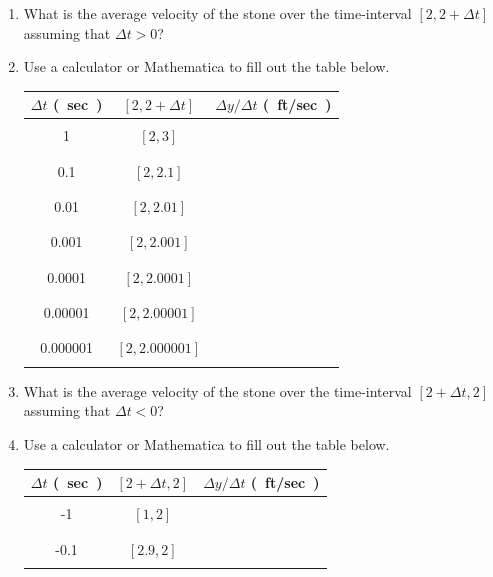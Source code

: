 \begin{enumerate}
\item What is the average velocity of the stone over the time-interval $[2,2+\Delta t]$ assuming that $\Delta t>0$?
\vfill
\item Use a calculator or Mathematica to fill out the table below.
\begin{table}[H]
\begin{tabular}{|c|c|c|}
\hline
$\Delta t$ \si{(sec)} & $[2,2+\Delta t]$ & $\Delta y/\Delta t$ \si{(ft/sec)}\\
\hline\hline
&&\\
1  & $[2,3]$ &\\
&&\\
\hline
&&\\
0.1 & $[2,2.1]$ & \\
&&\\
\hline
&&\\
0.01 & $[2,2.01]$ & \\
&&\\
\hline
&&\\
0.001 & $[2,2.001]$ & \\
&&\\
\hline
&&\\
0.0001 &$[2,2.0001]$& \\
&&\\
\hline
&&\\
0.00001 &$[2,2.00001]$& \\
&&\\
\hline
&&\\
0.000001 &$[2,2.000001]$& \\
&&\\
\hline
\end{tabular}
\end{table}
\vfill
\newpage
\item What is the average velocity of the stone over the time-interval $[2+\Delta t,2]$ assuming that $\Delta t<0$?
\vfill
\item Use a calculator or Mathematica to fill out the table below.
\begin{table}[H]
\begin{tabular}{|c|c|c|}
\hline
$\Delta t$ \si{(sec)} & $[2+\Delta t,2]$ & $\Delta y/\Delta t$ \si{(ft/sec)}\\
\hline\hline
&&\\
-1  &$[1,2]$ &\\
&&\\
\hline
&&\\
-0.1 &$[2.9,2]$& \\
&&\\

\end{tabular}
\end{table}
\end{enumerate}
